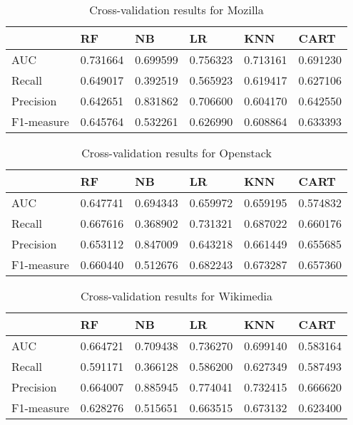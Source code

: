 \begin{table}[h]
    \caption{Cross-validation results for Mozilla}
    \label{table:mozilla-models}
    \centering
    \begin{tabular}{|l|l|l|l|l|l|}
        \hline
        ~          & RF       & NB       & LR       & KNN      & CART     \\ \hline
        AUC        & 0.731664 & 0.699599 & 0.756323 & 0.713161 & 0.691230 \\ \hline
        Recall     & 0.649017 & 0.392519 & 0.565923 & 0.619417 & 0.627106 \\ \hline
        Precision  & 0.642651 & 0.831862 & 0.706600 & 0.604170 & 0.642550 \\ \hline
        F1-measure & 0.645764 & 0.532261 & 0.626990 & 0.608864 & 0.633393 \\ \hline
    \end{tabular}
\end{table}

\begin{table}[h]
    \caption{Cross-validation results for Openstack}
    \label{table:openstack-models}
    \centering
    \begin{tabular}{|l|l|l|l|l|l|}
        \hline
        ~          & RF       & NB       & LR       & KNN      & CART     \\ \hline
        AUC        & 0.647741 & 0.694343 & 0.659972 & 0.659195 & 0.574832 \\ \hline
        Recall     & 0.667616 & 0.368902 & 0.731321 & 0.687022 & 0.660176 \\ \hline
        Precision  & 0.653112 & 0.847009 & 0.643218 & 0.661449 & 0.655685 \\ \hline
        F1-measure & 0.660440 & 0.512676 & 0.682243 & 0.673287 & 0.657360 \\ \hline
    \end{tabular}
\end{table}

\begin{table}[h]
    \caption{Cross-validation results for Wikimedia}
    \label{table:wikimedia-models}
    \centering
    \begin{tabular}{|l|l|l|l|l|l|}
        \hline
        ~          & RF       & NB       & LR       & KNN      & CART     \\ \hline
        AUC        & 0.664721 & 0.709438 & 0.736270 & 0.699140 & 0.583164 \\ \hline
        Recall     & 0.591171 & 0.366128 & 0.586200 & 0.627349 & 0.587493 \\ \hline
        Precision  & 0.664007 & 0.885945 & 0.774041 & 0.732415 & 0.666620 \\ \hline
        F1-measure & 0.628276 & 0.515651 & 0.663515 & 0.673132 & 0.623400 \\ \hline
    \end{tabular}
\end{table}

